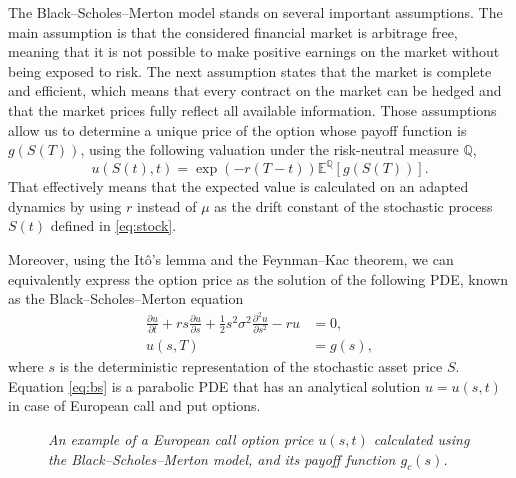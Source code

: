 \documentclass{UUThesisTemplate}
\begin{document}
\par
The Black--Scholes--Merton model stands on several important assumptions. The main assumption is that the considered financial market is arbitrage free, meaning that it is not possible to make positive earnings on the market without being exposed to risk. The next assumption states that the market is complete and efficient, which means that every contract on the market can be hedged and that the market prices fully reflect all available information. Those assumptions allow us to determine a unique price of the option whose payoff function is $g(S(T))$, using the following valuation under the risk-neutral measure $\mathbb{Q}$,
\begin{equation}
\label{eq:mc}
u(S(t), t)=\exp\left(-r(T-t)\right)\mathbb{E}^{\mathbb{Q}}\left[g(S(T))\right].
\end{equation}
That effectively means that the expected value is calculated on an adapted dynamics by using $r$ instead of $\mu$ as the drift constant of the stochastic process $S(t)$ defined in \eqref{eq:stock}. 

\par
Moreover, using the It\^o's lemma and the Feynman--Kac theorem, we can equivalently express the option price as the solution of the following PDE, known as the Black--Scholes--Merton equation
\begin{align}
\frac{\partial u}{\partial t} + r s \frac{\partial u} {\partial s} + \frac{1}{2} s^2 \sigma^2 \frac{\partial^2 u}{\partial s^2} - r u &= 0, \nonumber \\
u(s,T) &= g(s), \label{eq:bs}
\end{align}
where $s$ is the deterministic representation of the stochastic asset price $S$. Equation \eqref{eq:bs} is a parabolic PDE that has an analytical solution $u=u(s,t)$ in case of European call and put options. %

\begin{figure}[H]
\centering

\caption{\emph{An example of a European call option price $u(s,t)$ calculated using the Black--Scholes--Merton model, and its payoff function $g_c(s)$.}}
\label{fig:eucallpayoff}
\end{figure}
\end{document}
